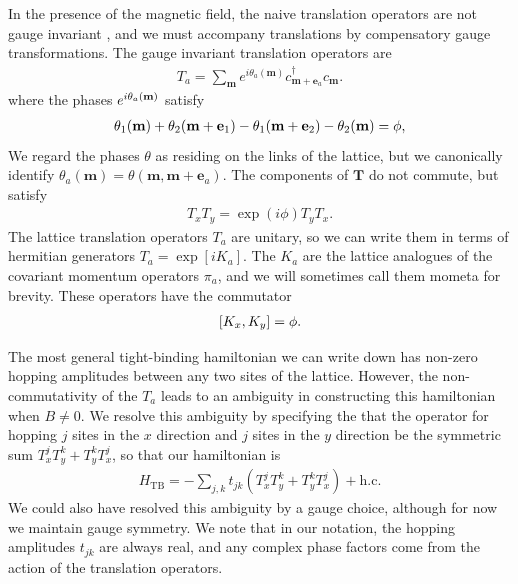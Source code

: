 \documentclass[aps,prb,twocolumn,letterpaper,twoside,nobalancelastpage,groupedaddress,amsmath,amssymb,floatfix,citeautoscript]{revtex4-1}
\begin{document}
In the presence of the magnetic field, the naive translation operators are not gauge invariant \cite{fradkin_field_2013}, and we must accompany translations by compensatory gauge transformations. The gauge invariant translation operators are
\begin{align*}
T_a = \sum_{\mathbf{m}} e^{i\theta_a(\mathbf{m})} c^{\dag}_{\mathbf{m} + \mathbf{e}_a}c_{\mathbf{m}}.
\end{align*}
where the phases $e^{i\theta_a(\mathbf{m})}$ satisfy 
\begin{align*}
\theta_1(\mathbf{m}) + \theta_2(\mathbf{m} + \mathbf{e}_1) - \theta_1(\mathbf{m} + \mathbf{e}_2) - \theta_2(\mathbf{m}) = \phi,
\end{align*}
We regard the phases $\theta$ as residing on the links of the lattice, but we canonically identify $\theta_a(\mathbf{m}) = \theta(\mathbf{m},\mathbf{m}+\mathbf{e}_a)$. The components of $\mathbf{T}$ do not commute, but satisfy 
\begin{align*}
T_x T_y = \exp(i\phi) T_y T_x.
\end{align*}
The lattice translation operators $T_a$ are unitary, so we can write them in terms of hermitian generators $T_a = \exp\left[i K_a\right]$. The $K_a$ are the lattice analogues of the covariant momentum operators $\pi_a$, and we will sometimes call them mometa for brevity. These operators have the commutator
\begin{align*}
\comm{K_x}{K_y} = \phi.
\end{align*}


The most general tight-binding hamiltonian we can write down has non-zero hopping amplitudes between any two sites of the lattice. However, the non-commutativity of the $T_a$ leads to an ambiguity in constructing this hamiltonian when $B\neq0$. We resolve this ambiguity by specifying the that the operator for hopping $j$ sites in the $x$ direction and $j$ sites in the $y$ direction be the symmetric sum $T_x^j T_y^k + T_y^kT_x^j$, so that our hamiltonian is
\begin{align*}
H_{\text{TB}} = -\sum_{j,k} t_{jk}\left(T_x^j T_y^k + T_y^kT_x^j\right) + \text{h.c.}
\end{align*}
We could also have resolved this ambiguity by a gauge choice, although for now we maintain gauge symmetry. We note that in our notation, the hopping amplitudes $t_{jk}$ are always real, and any complex phase factors come from the action of the translation operators.
\end{document}
